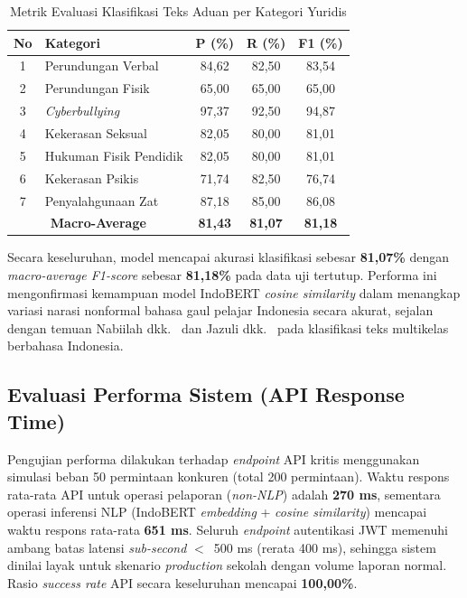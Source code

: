 \documentclass[conference]{IEEEtran}
\begin{document}
\begin{table}[htbp]
\caption{Metrik Evaluasi Klasifikasi Teks Aduan per Kategori Yuridis}
\label{tab:nlpeval}
\begin{center}
\begin{tabular}{|c|p{2.4cm}|c|c|c|}
\hline
\textbf{No} & \textbf{Kategori} & \textbf{P (\%)} & \textbf{R (\%)} & \textbf{F1 (\%)} \\
\hline
1 & Perundungan Verbal    & 84,62 & 82,50 & 83,54 \\
\hline
2 & Perundungan Fisik     & 65,00 & 65,00 & 65,00 \\
\hline
3 & \textit{Cyberbullying}& 97,37 & 92,50 & 94,87 \\
\hline
4 & Kekerasan Seksual     & 82,05 & 80,00 & 81,01 \\
\hline
5 & Hukuman Fisik Pendidik& 82,05 & 80,00 & 81,01 \\
\hline
6 & Kekerasan Psikis      & 71,74 & 82,50 & 76,74 \\
\hline
7 & Penyalahgunaan Zat    & 87,18 & 85,00 & 86,08 \\
\hline
\multicolumn{2}{|c|}{\textbf{Macro-Average}} & \textbf{81,43} & \textbf{81,07} & \textbf{81,18} \\
\hline
\end{tabular}
\end{center}
\end{table}

Secara keseluruhan, model mencapai akurasi klasifikasi sebesar \textbf{81,07\%} dengan \textit{macro-average F1-score} sebesar \textbf{81,18\%} pada data uji tertutup. Performa ini mengonfirmasi kemampuan model IndoBERT \textit{cosine similarity} dalam menangkap variasi narasi nonformal bahasa gaul pelajar Indonesia secara akurat, sejalan dengan temuan Nabiilah dkk.~\cite{nabiilah2024} dan Jazuli dkk.~\cite{jazuli2025} pada klasifikasi teks multikelas berbahasa Indonesia.

\subsection{Evaluasi Performa Sistem (API Response Time)}

Pengujian performa dilakukan terhadap \textit{endpoint} API kritis menggunakan simulasi beban 50 permintaan konkuren (total 200 permintaan). Waktu respons rata-rata API untuk operasi pelaporan (\textit{non-NLP}) adalah \textbf{270 ms}, sementara operasi inferensi NLP (IndoBERT \textit{embedding} + \textit{cosine similarity}) mencapai waktu respons rata-rata \textbf{651 ms}. Seluruh \textit{endpoint} autentikasi JWT memenuhi ambang batas latensi \textit{sub-second} $<$~500 ms (rerata 400 ms), sehingga sistem dinilai layak untuk skenario \textit{production} sekolah dengan volume laporan normal. Rasio \textit{success rate} API secara keseluruhan mencapai \textbf{100,00\%}.
\end{document}
